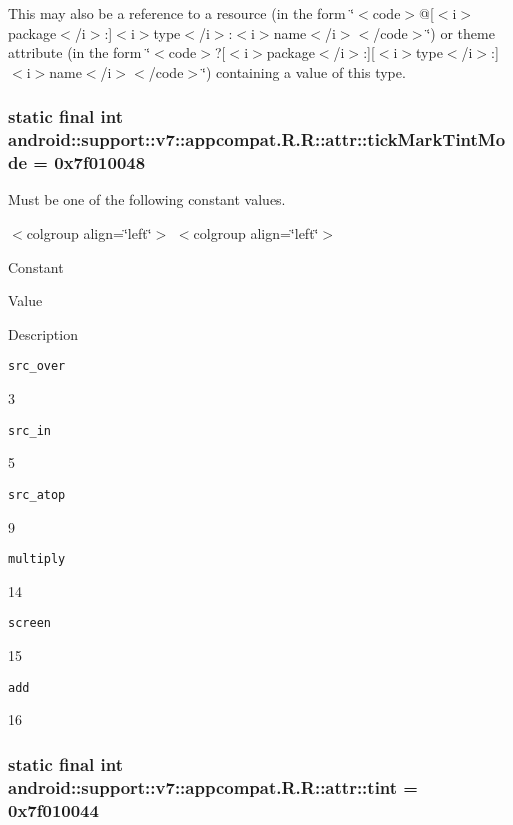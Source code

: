 This may also be a reference to a resource (in the form \char`\"{}$<$code$>$@\mbox{[}$<$i$>$package$<$/i$>$:\mbox{]}$<$i$>$type$<$/i$>$:$<$i$>$name$<$/i$>$$<$/code$>$\char`\"{}) or theme attribute (in the form \char`\"{}$<$code$>$?\mbox{[}$<$i$>$package$<$/i$>$:\mbox{]}\mbox{[}$<$i$>$type$<$/i$>$:\mbox{]}$<$i$>$name$<$/i$>$$<$/code$>$\char`\"{}) containing a value of this type. \hypertarget{classandroid_1_1support_1_1v7_1_1appcompat_1_1_r_1_1attr_bd56a899495054c7ab47dcd1047ed2c0}{
\subsubsection[{tickMarkTintMode}]{\setlength{\rightskip}{0pt plus 5cm}static final int android::support::v7::appcompat.R.R::attr::tickMarkTintMode = 0x7f010048}}
\label{classandroid_1_1support_1_1v7_1_1appcompat_1_1_r_1_1attr_bd56a899495054c7ab47dcd1047ed2c0}


Must be one of the following constant values. \begin{TabularC}{0}
\hline
\end{TabularC}
$<$colgroup align=\char`\"{}left\char`\"{}$>$ $<$colgroup align=\char`\"{}left\char`\"{}$>$ 

Constant

Value

Description 

{\tt src\_\-over}

3

{\tt src\_\-in}

5

{\tt src\_\-atop}

9

{\tt multiply}

14

{\tt screen}

15

{\tt add}

16\hypertarget{classandroid_1_1support_1_1v7_1_1appcompat_1_1_r_1_1attr_8dcc08b0ca1bf472199c2d29cf9c00fa}{
\subsubsection[{tint}]{\setlength{\rightskip}{0pt plus 5cm}static final int android::support::v7::appcompat.R.R::attr::tint = 0x7f010044}}
\label{classandroid_1_1support_1_1v7_1_1appcompat_1_1_r_1_1attr_8dcc08b0ca1bf472199c2d29cf9c00fa}


